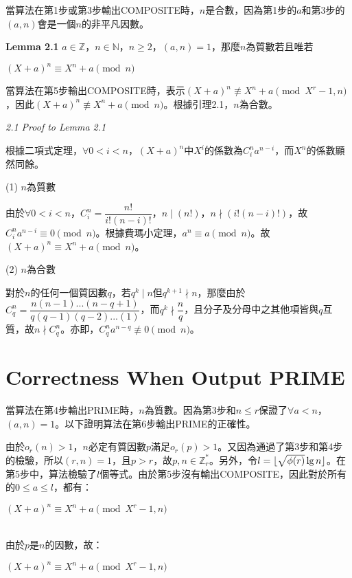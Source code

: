 \documentclass{article}
\DeclarePairedDelimiter\floor{\lfloor}{\rfloor}
\newcommand{\nequiv}{\not\equiv}
\begin{document}
    當算法在第1步或第3步輸出COMPOSITE時，$n$是合數，因為第1步的$a$和第3步的$(a,n)$會是一個$n$的非平凡因數。

\begin{mdframed}
\noindent\textbf{Lemma 2.1} $a\in\mathbb{Z}$，$n\in\mathbb{N}$，$n\geq 2$，$(a,n)=1$，那麼$n$為質數若且唯若\\
    \centerline{$(X+a)^n\equiv X^n+a \pmod{n}$}
\end{mdframed}

    當算法在第5步輸出COMPOSITE時，表示$(X+a)^n\nequiv X^n+a \pmod{X^r-1, n}$，因此$(X+a)^n\nequiv X^n+a \pmod{n}$。根據引理2.1，$n$為合數。

\noindent\textit{2.1 Proof to Lemma 2.1} 

    根據二項式定理，$\forall 0<i<n$，$(X+a)^n$中$X^i$的係數為$C^n_ia^{n-i}$，而$X^n$的係數顯然同餘。

    \noindent (1) $n$為質數
    
        由於$\forall 0<i<n$，$C^n_i=\dfrac{n!}{i!(n-i)!}$，$n\mid(n!)$，$n\nmid(i!(n-i)!)$，故$C^n_ia^{n-i}\equiv 0\pmod{n}$。根據費瑪小定理，$a^n\equiv a\pmod{n}$。故$(X+a)^n\equiv X^n+a \pmod{n}$。

    \noindent (2) $n$為合數

        對於$n$的任何一個質因數$q$，若$q^k\mid n$但$q^{k+1}\nmid n$，那麼由於$C^n_q=\dfrac{n(n-1)...(n-q+1)}{q(q-1)(q-2)...(1)}$，而$q^k\nmid\dfrac{n}{q}$，且分子及分母中之其他項皆與$q$互質，故$n\nmid C^n_q$。亦即，$C^n_qa^{n-q}\not\equiv 0\pmod{n}$。

\section{Correctness When Output PRIME}

    當算法在第4步輸出PRIME時，$n$為質數。因為第3步和$n\leq r$保證了$\forall a<n$，$(a,n)=1$。以下證明算法在第6步輸出PRIME的正確性。

    由於$o_r(n)>1$，$n$必定有質因數$p$滿足$o_r(p)>1$。又因為通過了第3步和第4步的檢驗，所以$(r,n)=1$，且$p>r$，故$p,n\in \mathbb{Z}_r^*$。另外，令$l=\floor{\sqrt{\phi(r)}\lg n}$。在第5步中，算法檢驗了$l$個等式。由於第5步沒有輸出COMPOSITE，因此對於所有的$0\leq a\leq l$，都有：\\
    \centerline{$(X+a)^n\equiv X^n+a\pmod{X^r-1, n}$}\\
由於$p$是$n$的因數，故：\\
    \centerline{$(X+a)^n\equiv X^n+a\pmod{X^r-1, n}$}\\
\end{document}
